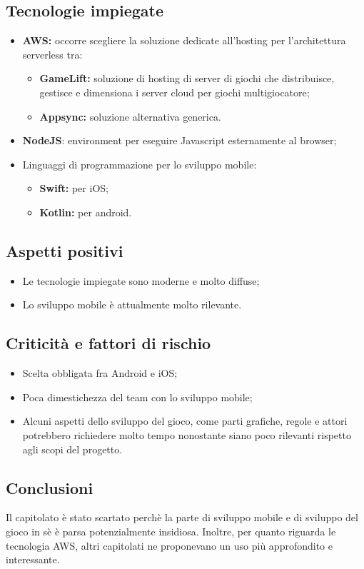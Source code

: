 \subsection{Tecnologie impiegate}
\begin{itemize}
    \item \textbf{AWS:} occorre scegliere la soluzione dedicate all'hosting per l'architettura serverless tra:
    \begin{itemize}
        \item \textbf{GameLift:} soluzione di hosting di server di giochi che distribuisce, gestisce e dimensiona i server cloud per giochi multigiocatore;
        \item \textbf{Appsync:} soluzione alternativa generica.
    \end{itemize}
    \item \textbf{NodeJS}: environment per eseguire Javascript esternamente al browser;
    \item Linguaggi di programmazione per lo sviluppo mobile: 
    \begin{itemize}
        \item \textbf{Swift:} per iOS;
        \item \textbf{Kotlin:} per android.
    \end{itemize}
\end{itemize}
\subsection{Aspetti positivi}
\begin{itemize}
    \item Le tecnologie impiegate sono moderne e molto diffuse;
    \item Lo sviluppo mobile è attualmente molto rilevante.
\end{itemize}
\subsection{Criticità e fattori di rischio}
\begin{itemize}
    \item Scelta obbligata fra Android e iOS;
    \item Poca dimestichezza del team con lo sviluppo mobile;
    \item Alcuni aspetti dello sviluppo del gioco, come parti grafiche, regole e attori potrebbero richiedere molto tempo nonostante siano poco rilevanti rispetto agli scopi del progetto.
\end{itemize}
\subsection{Conclusioni}
Il capitolato è stato scartato perchè la parte di sviluppo mobile e di sviluppo del gioco in sè è parsa potenzialmente insidiosa. Inoltre, per quanto riguarda le tecnologia AWS, altri capitolati ne proponevano un uso più approfondito e interessante.